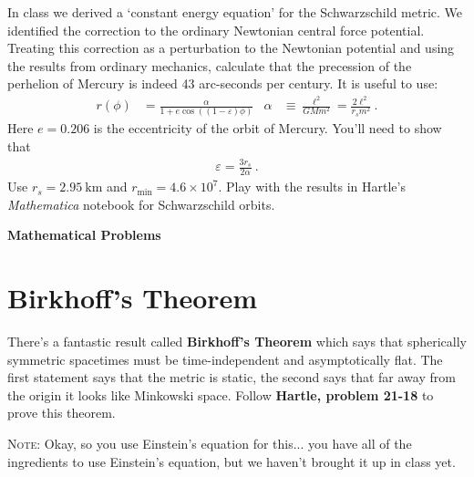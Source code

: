 \documentclass[12pt]{article}
\numberwithin{equation}{section}    %
\begin{document}
In class we derived a `constant energy equation' for the Schwarzschild metric. We identified the correction to the ordinary Newtonian central force potential. Treating this correction as a perturbation to the Newtonian potential and using the results from ordinary mechanics, calculate that the precession of the perhelion of Mercury is indeed 43 arc-seconds per century.  It is useful to use:
\begin{align}
	r(\phi) &= \frac{\alpha}{1+e\cos\left((1-\varepsilon)\phi\right)}
	&
	\alpha &\equiv \frac{\ell^2}{GMm^2} = \frac{2\ell^2}{r_sm^2} \ .
\end{align}
Here $e=0.206$ is the eccentricity of the orbit of Mercury. You'll need to show that 
\begin{align}
	\varepsilon = \frac{3r_s}{2\alpha} \ .
\end{align}
Use $r_s = 2.95~\text{km}$ and $r_\text{min} = 4.6\times 10^{7}$. Play with the results in Hartle's \emph{Mathematica} notebook for Schwarzschild orbits.


\vspace{2em}
{\Large\textbf{\textsf{Mathematical Problems}}}


\section{Birkhoff's Theorem}

There's a fantastic result called \textbf{Birkhoff's Theorem} which says that spherically symmetric spacetimes must be time-independent and asymptotically flat. The first statement says that the metric is static, the second says that far away from the origin it looks like Minkowski space. Follow \textbf{Hartle, problem 21-18} to prove this theorem. 

\textsc{Note}: Okay, so you use Einstein's equation for this... you have all of the ingredients to use Einstein's equation, but we haven't brought it up in class yet. 

 


%
\end{document}
